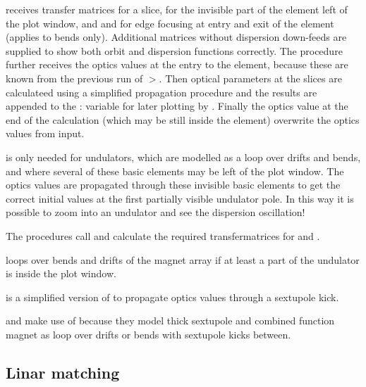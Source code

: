 \documentclass[12pt]{article}
\newcommand\code[1]{{\tt #1}}
\newcommand{\unico}[1]{{\color{burntorange}\code{#1}}}
\newcommand{\prcod}[2]{\opauni{#1}$>$\unico{#2}}
\newcommand{\vrcod}[2]{\opauni{#1}:\unico{#2}}
\newcommand{\opagui}[1]{\colorbox{blue!20}{{\color{black}\code{#1}}}}
\newcommand{\oguih}[2]{\subsection{\label{#2}#1}{\Huge\opagui{#2}}\\}
\newcommand{\opauni}[1]{\colorbox{orange!30}{{\color{black}\code{#1}}}}
\newcommand{\ouni}[1]{\hyperref[#1]{\opauni{#1}}}
\newcommand{\feature}[1]{{\color{cadmiumgreen} #1}}
\begin{document}
\unico{SlicingN} receives transfer matrices \unico{msl} for a slice, \unico{mof} for the invisible part of the element left of the plot window, and \unico{min} and \unico{mex} for edge focusing at entry and exit of the element (applies to bends only). Additional matrices \unico{mof0,msl0} without dispersion down-feeds are supplied to show both orbit and dispersion functions correctly. The procedure further receives the optics values at the entry to the element, because these are known from the previous run of \prcod{linoplib}{Lattel}. Then optical parameters at the slices are calculateed using a simplified propagation procedure and the results are appended to the \vrcod{globlib}{Curve} variable for later plotting by \ouni{linoplib}. Finally the optics value at the end of the calculation (which may be still inside the element) overwrite the optics values from input.

\unico{SkippingN} is only needed for undulators, which are modelled as a loop over drifts and bends, and where several of these basic elements may be left of the plot window. The optics values are propagated through these invisible basic elements to get the correct initial values at the first partially visible undulator pole. \feature{In this way it is possible to zoom into an undulator and see the dispersion oscillation!}

The \unico{Slice(Drift,Quad,Sol,Bend)N} procedures call \unico{SliceSet} and calculate the required transfermatrices for \unico{SlicingN} and \unico{SkippingN}.

\unico{SliceUnduN} loops over bends and drifts of the magnet array if at least a part of the undulator is inside the plot window.

\unico{SextKickN} is a simplified version of \unico{ThinSextupole} to propagate optics values through a sextupole kick.

\unico{SliceSextN} and \unico{SliceCombN} make use of \unico{SextKickN} because they model thick sextupole and combined function magnet as loop over drifts or bends with sextupole kicks between.



\oguih{Linar matching}{omatching} 
\end{document}
